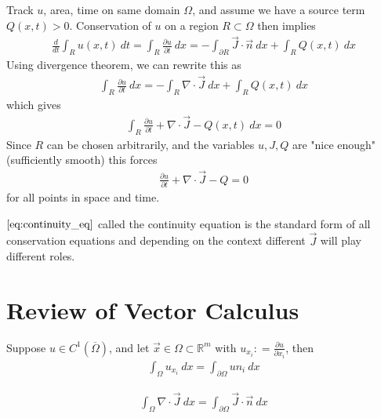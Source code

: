 Track $u$, area, time on same domain $\Omega$, and assume we have a
source term $Q(x, t) > 0$. Conservation of $u$ on a region $R \subset
\Omega$ then implies
\begin{align*}
  \frac{d}{dt}\int_R u(x, t) \ d  t = \int_R \frac{\partial
  u}{\partial t} \ d x = - \int_{\partial R} \vec{J} \cdot \vec{n}
  \ d x + \int_R Q(x, t) \ dx
\end{align*}
Using divergence theorem, we can rewrite this as
\begin{align*}
  \int_R \frac{\partial u}{\partial t} \ d x = - \int_{R} \nabla
  \cdot \vec{J} \ d x + \int_R Q(x, t) \ dx
\end{align*}
which gives
\begin{align*}
  \int_R \frac{\partial u}{\partial t} + \nabla \cdot \vec{J}  - Q(x,
  t) \ dx = 0
\end{align*}
Since $R$ can be chosen arbitrarily, and the variables $u, J, Q$ are
"nice enough" (sufficiently smooth) this forces
\begin{align}
  \label{eq:continuity_eq}
  \frac{\partial u}{\partial t} + \nabla \cdot \vec{J} - Q = 0
\end{align}
for all points in space and time.

$\autoref{eq:continuity_eq}$ called the continuity equation is the
standard form of all conservation equations and depending on the
context different $\vec{J}$ will play different roles.

\section{Review of Vector Calculus}

\begin{theorem}
  Suppose $u \in C^1(\overline{\Omega})$, and let $\vec{x} \in \Omega
  \subset \mathbb{R}^m$ with $u_{x_i}: = \frac{\partial u}{\partial x_i}$, then
  \begin{align*}
    \int_{\Omega}  u_{x_i} \ d x = \int_{\partial \Omega}   u n_i \ d x
  \end{align*}
\end{theorem}

\begin{theorem}
  \begin{align*}
    \int_\Omega \nabla \cdot \vec{J} \ d  x = \int_{\partial \Omega}
    \vec{J} \cdot \vec{n} \ d x
  \end{align*}
\end{theorem}


